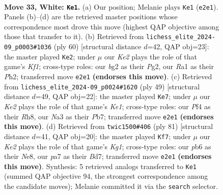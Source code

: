\documentclass[11pt]{article}
\begin{document}
\clearpage

\begin{figure}[p]\centering
\begin{subfigure}{0.46\textwidth}\centering
\resizebox{\linewidth}{!}{%
\newchessgame
\chessboard[
  setfen={r7/p1pp4/1p3nk1/5p1p/2P2P2/NP6/P1BPK1bP/R7 w - - 4 33},
  showmover=false,
  pgfstyle=straightmove, color=movearrow, markmove={e2-e1}
]}
\caption{}
\end{subfigure}\hfill
\begin{subfigure}{0.46\textwidth}\centering
\resizebox{\linewidth}{!}{%
\newchessgame
\chessboard[
  setfen={3b1n2/5kpp/4pp2/p1p5/P1P5/1P6/1B3PPP/3N1K2 w - - 2 31},
  showmover=false,
  pgfstyle=straightmove, color=movearrow, markmove={f1-e2}
]}
\caption{}
\end{subfigure}
\\[4pt]
\begin{subfigure}{0.46\textwidth}\centering
\resizebox{\linewidth}{!}{%
\newchessgame
\chessboard[
  setfen={4k2r/1p1n1pp1/1pb1p3/7p/P4B2/2N4P/1P3PP1/R5K1 b k - 4 25},
  showmover=false,
  pgfstyle=straightmove, color=movearrow, markmove={e8-e7}
]}
\caption{}
\end{subfigure}\hfill
\begin{subfigure}{0.46\textwidth}\centering
\resizebox{\linewidth}{!}{%
\newchessgame
\chessboard[
  setfen={4n1k1/r2b2p1/5p1p/8/2p1PB2/2P2P2/1R2NKPP/8 b - - 3 41},
  showmover=false,
  pgfstyle=straightmove, color=movearrow, markmove={g8-f7}
]}
\caption{}
\end{subfigure}
\caption{\textbf{Move 33, White: \texttt{Ke1}.} (a) Our position; Melanie plays \texttt{Ke1} (\texttt{e2e1}). Panels (b)--(d) are the retrieved master positions whose correspondence most drove this move (highest QAP objective among those that transfer to it). (b) Retrieved from \texttt{lichess\_elite\_2024-09\_p0003\#1036} (ply 60) [structural distance $d$=42, QAP obj=23]: the master played \texttt{Ke2}; under $\mu$ our \emph{Ke2} plays the role of that game's \emph{Kf1}; cross-type roles: our \emph{b}g2 as their \emph{P}g2, our \emph{R}a1 as their \emph{P}h2; transferred move \texttt{e2e1} \textbf{(endorses this move)}. (c) Retrieved from \texttt{lichess\_elite\_2024-09\_p0024\#1620} (ply 49) [structural distance $d$=49, QAP obj=22]: the master played \texttt{Ke7}; under $\mu$ our \emph{Ke2} plays the role of that game's \emph{Ke1}; cross-type roles: our \emph{P}f4 as their \emph{R}h8, our \emph{N}a3 as their \emph{P}b7; transferred move \texttt{e2e1} \textbf{(endorses this move)}. (d) Retrieved from \texttt{twic1500\#406} (ply 81) [structural distance $d$=41, QAP obj=20]: the master played \texttt{Kf7}; under $\mu$ our \emph{Ke2} plays the role of that game's \emph{Kg1}; cross-type roles: our \emph{p}b6 as their \emph{N}e8, our \emph{p}a7 as their \emph{B}d7; transferred move \texttt{e2e1} \textbf{(endorses this move)}. Synthesis: 5 retrieved analogs transferred to \texttt{Ke1} (summed QAP objective 94, the strongest correspondence among the candidate moves); Melanie committed it via the \texttt{search} selector.}
\label{fig:thought-m64}
\end{figure}
\end{document}
